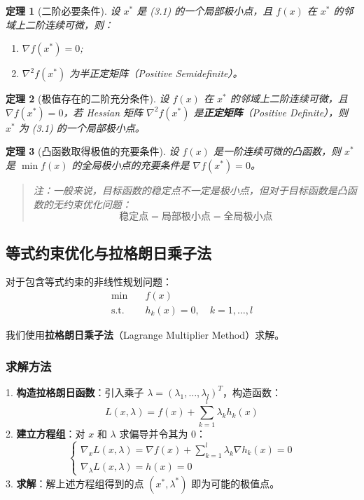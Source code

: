 \documentclass[a4paper,12pt]{ctexart} %
\newtheorem{theorem}{定理}[section]
\begin{document}
	\begin{theorem}[二阶必要条件]
		设 $x^*$ 是 (3.1) 的一个局部极小点，且 $f(x)$ 在 $x^*$ 的邻域上二阶连续可微，则：
		\begin{enumerate}
			\item $\nabla f(x^*) = 0$;
			\item $\nabla^2 f(x^*)$ 为半正定矩阵（Positive Semidefinite）。
		\end{enumerate}
	\end{theorem}
	
	\begin{theorem}[极值存在的二阶充分条件]
		设 $f(x)$ 在 $x^*$ 的邻域上二阶连续可微，且 $\nabla f(x^*) = 0$，若 Hessian 矩阵 $\nabla^2 f(x^*)$ 是\textbf{正定矩阵}（Positive Definite），则 $x^*$ 为 (3.1) 的一个局部极小点。
	\end{theorem}
	
	\begin{theorem}[凸函数取得极值的充要条件]
		设 $f(x)$ 是一阶连续可微的凸函数，则 $x^*$ 是 $\min f(x)$ 的全局极小点的充要条件是 $\nabla f(x^*) = 0$。
		\begin{quote}
			注：一般来说，目标函数的稳定点不一定是极小点，但对于目标函数是凸函数的无约束优化问题：
			\[ \text{稳定点} = \text{局部极小点} = \text{全局极小点} \]
		\end{quote}
	\end{theorem}
	
	\subsection{等式约束优化与拉格朗日乘子法}
	
	对于包含等式约束的非线性规划问题：
	\begin{equation}
		\begin{aligned}
			\min \quad & f(x) \\
			\text{s.t.} \quad & h_k(x) = 0, \quad k=1,\dots,l
		\end{aligned}
	\end{equation}
	
	我们使用\textbf{拉格朗日乘子法}（Lagrange Multiplier Method）求解。
	
	\subsubsection*{求解方法}
	1. \textbf{构造拉格朗日函数}：引入乘子 $\lambda = (\lambda_1, \dots, \lambda_l)^T$，构造函数：
	\[ L(x, \lambda) = f(x) + \sum_{k=1}^{l} \lambda_k h_k(x) \]
	2. \textbf{建立方程组}：对 $x$ 和 $\lambda$ 求偏导并令其为 0：
	\[
	\begin{cases}
		\nabla_x L(x, \lambda) = \nabla f(x) + \sum_{k=1}^{l} \lambda_k \nabla h_k(x) = 0 \\
		\nabla_\lambda L(x, \lambda) = h(x) = 0
	\end{cases}
	\]
	3. \textbf{求解}：解上述方程组得到的点 $(x^*, \lambda^*)$ 即为可能的极值点。
	
\end{document}
